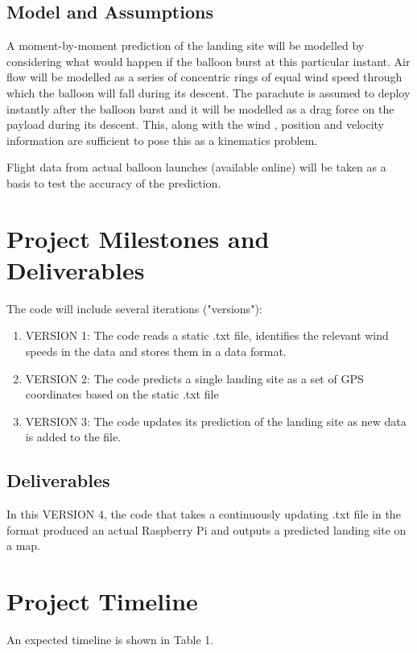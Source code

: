 \documentclass[11pt]{article}
\begin{document}
\subsection{Model and Assumptions}

A moment-by-moment prediction of the landing site will be modelled by considering what would happen if the balloon burst at this particular instant. Air flow will be modelled as a series of concentric rings of equal wind speed through which the balloon will fall during its descent. The parachute is assumed to deploy instantly after the balloon burst and it will be modelled as a drag force on the payload during its descent. This, along with the wind , position and velocity information are sufficient to pose this as a kinematics problem. 

Flight data from actual balloon launches (available online) will be taken as a basis to test the accuracy of the prediction.


\section{Project Milestones and Deliverables}

The code will include several iterations ("versions"):

\begin{enumerate}
\item VERSION 1: The code reads a static .txt file, identifies the relevant wind speeds in the data and stores them in a data format. 
\item VERSION 2: The code predicts a single landing site as a set of GPS coordinates based on the static .txt file
\item VERSION 3: The code updates its prediction of the landing site as new data is added to the file.
\end{enumerate}


\subsection{Deliverables}
In this VERSION 4, the code that takes a continuously updating .txt file in the format produced an actual Raspberry Pi and outputs a predicted landing site on a map.

\section{Project Timeline}

An expected timeline is shown in Table 1.
\end{document}
